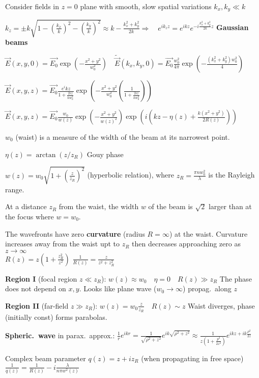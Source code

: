 \begin{squishlist}
    \item Consider fields in $z=0$ plane with smooth, slow spatial variations $k_x, k_y \ll k$
    \item $k_z = \pm k \sqrt{1 - \left(\frac{k_x}{k}\right)^2 - \left(\frac{k_y}{k}\right)^2}\approx k - \tfrac{k_x^2 + k_y^2}{2k} \Rightarrow \quad e^{ik_z z} = e^{ikz}e^{-i \tfrac{k_x^2 + k_y^2}{2k}z}$ \textbf{Gaussian beams}
    \item $\vec{E}(x,y,0) = \vec{E_0} \exp\left({-\tfrac{x^2 + y^2}{w_0^2}}\right) \quad \tilde{\vec{E}}(k_x,k_y,0) = \vec{E_0} \frac{w_0^2}{4\pi} \exp \left(- \frac{(k_x^2 + k_y^2)w_0^2}{4}\right)$
    \item $\vec{E}(x,y,z) = \vec{E_0} \frac{e^ikz}{1 + \tfrac{2iz}{kw_0^2}} \exp\left({-\tfrac{x^2 + y^2}{w_0^2}\left(\tfrac{1}{1 + \tfrac{2iz}{kw_0^2}}\right)}\right)$
    \item $\vec{E}(x,y,z) = \vec{E_0} \frac{w_0}{w(z)}\exp\left(-\frac{x^2 + y^2}{w(z)^2}\right) \exp \left(i \left(kz - \eta(z) + \frac{k(x^2 + y^2)}{2 R(z)}\right)\right)$
    \item $w_0$ (waist) is a measure of the width of the beam at its narrowest point.
    \item $\eta(z) = \arctan (z/z_R)$ Gouy phase
    \item $w(z) = w_0 \sqrt{1 + \left(\frac{z}{z_R}\right)^2}$ (hyperbolic relation), where $z_R = \frac{\pi n w_0^2}{\lambda}$ is the Rayleigh range.
    \item At a distance $z_R$ from the waist, the width $w$ of the beam is $\sqrt{2}$ larger than at the focus where $w=w_0$.
    \item The wavefronts have zero \textbf{curvature} (radius $R = \infty$) at the waist. Curvature increases away from the waist upt to $z_R$ then decreases approaching zero as $z \rightarrow \infty$ \\
    $R(z) = z \left(1 + \frac{z_R^2}{z^2}\right)$ \qquad$\frac{1}{R(z)} = \frac{z}{z^2 + z^2_R}$

    \item \textbf{Region I} (focal region $z \ll z_R$): $w(z) \approx w_0 \quad \eta=0 \quad R(z) \gg z_R$ \quad The phase does not depend on $x,y$. Looks like plane wave ($w_0 \rightarrow \infty$) propag.\ along $z$
    \item \textbf{Region II} (far-field $z \gg z_R$): $w(z) = w_0 \frac{z}{z_R} \quad R(z) \sim z$ \quad Waist diverges, phase (initially const) forms parabolas.
    \item \textbf{Spheric.\ wave} in parax.\ approx.: $\frac{1}{r}e^{ikr} = \frac{1}{\sqrt{\rho^2 + z^2}}e^{ik \sqrt{\rho^2 + z^2}} \approx \frac{1}{z \left(1 + \frac{p^2}{2z^2}\right)}e^{ikz+ik\frac{\rho^2}{2z}}$
    \item Complex beam parameter $q(z) = z + i z_R$ (when propagating in free space) \\ $\frac{1}{q(z)} = \frac{1}{R(z)} - i \frac{\lambda}{n \pi w^2(z)}$
\end{squishlist}

